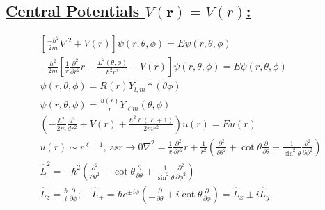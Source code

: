 \documentclass[a4paper,12pt]{article}
\begin{document}
\subsection*{\underline{Central Potentials $V(\mathbf{r})=V(r)$:}}
\begin{gather}
    \left[ \frac{-\hbar^2}{2m}\nabla^2+V(r) \right]\psi(r,\theta,\phi)=E\psi(r,\theta,\phi)\\
    -\frac{\hbar^2}{2m}\left[ \frac{1}{r}\frac{\partial^2}{\partial r^2}r- \frac{L^2(\theta,\phi)}{\hbar^2r^2}+V(r)\right]\psi(r,\theta,\phi)=E\psi(r,\theta,\phi)\\
    \psi(r, \theta, \phi)=R(r)Y_{l,m}*(\theta\phi)\\
    \psi(r, \theta, \phi)=\frac{u(r)}{r} Y_{\ell m}(\theta, \phi)\\
    \left(-\frac{\hbar^{2}}{2 m} \frac{d^{2}}{d r^{2}}+V(r)+\frac{\hbar^{2} \ell(\ell+1)}{2 m r^{2}}\right) u(r)=E u(r)\\
    u(r) \sim r^{\ell+1},\ \mathrm{as} r \rightarrow 0
    \nabla^{2}=\frac{1}{r} \frac{\partial^{2}}{\partial r^{2}} r+\frac{1}{r^{2}}\left(\frac{\partial^{2}}{\partial \theta^{2}}+\cot \theta \frac{\partial}{\partial \theta}+\frac{1}{\sin ^{2} \theta} \frac{\partial^{2}}{\partial \phi^{2}}\right) \\
    \hat{L}^{2}=-\hbar^{2}\left(\frac{\partial^{2}}{\partial \theta^{2}}+\cot \theta \frac{\partial}{\partial \theta}+\frac{1}{\sin ^{2} \theta} \frac{\partial^{2}}{\partial \phi^{2}}\right) \\
    \hat{L}_{z}=\frac{\hbar}{i} \frac{\partial}{\partial \phi} ; \quad \hat{L}_{\pm}=\hbar e^{\pm i \phi}\left(\pm \frac{\partial}{\partial \theta}+i \cot \theta \frac{\partial}{\partial \phi}\right)=\hat{L}_{x}\pm i\hat{L}_{y}\\
\end{gather}
\end{document}
